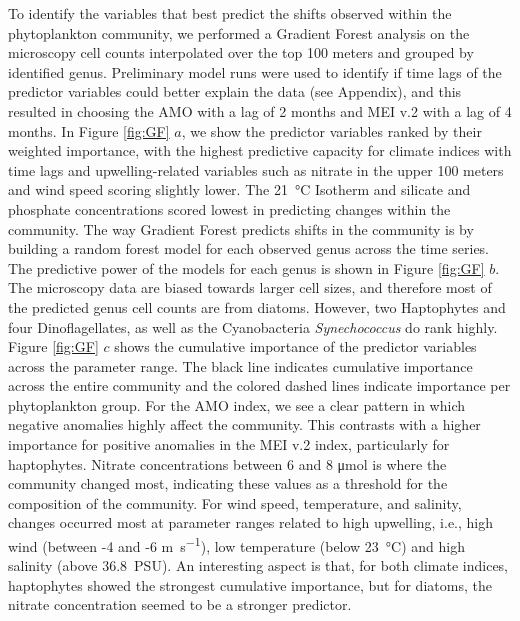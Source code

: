 \documentclass[draft]{agujournal2019}
\begin{document}
To identify the variables that best predict the shifts observed within the phytoplankton community, we performed a Gradient Forest analysis on the microscopy cell counts interpolated over the top 100 meters and grouped by identified genus. Preliminary model runs were used to identify if time lags of the predictor variables could better explain the data (see Appendix), and this resulted in choosing the AMO with a lag of 2 months and MEI v.2 with a lag of 4 months. In Figure \ref{fig:GF} $a$, we show the predictor variables ranked by their weighted importance, with the highest predictive capacity for climate indices with time lags and upwelling-related variables such as nitrate in the upper 100 meters and wind speed scoring slightly lower. The \qty{21}{\celsius} Isotherm and silicate and phosphate concentrations scored lowest in predicting changes within the community. The way Gradient Forest predicts shifts in the community is by building a random forest model for each observed genus across the time series. The predictive power of the models for each genus is shown in Figure \ref{fig:GF} $b$. The microscopy data are biased towards larger cell sizes, and therefore most of the predicted genus cell counts are from diatoms. However, two Haptophytes and four Dinoflagellates, as well as the Cyanobacteria \textit{Synechococcus} do rank highly.
Figure \ref{fig:GF} $c$ shows the cumulative importance of the predictor variables across the parameter range. The black line indicates cumulative importance across the entire community and the colored dashed lines indicate importance per phytoplankton group. For the AMO index, we see a clear pattern in which negative anomalies highly affect the community. This contrasts with a higher importance for positive anomalies in the MEI v.2 index, particularly for haptophytes. Nitrate concentrations between 6 and 8 \unit{\micro \mole} is where the community changed most, indicating these values as a threshold for the composition of the community. For wind speed, temperature, and salinity, changes occurred most at parameter ranges related to high upwelling, i.e., high wind (between -4 and -6 \unit{m.s^{-1}}), low temperature (below \qty{23}{\celsius}) and high salinity (above \qty{36.8}{PSU}). An interesting aspect is that, for both climate indices, haptophytes showed the strongest cumulative importance, but for diatoms, the nitrate concentration seemed to be a stronger predictor. 

\end{document}
